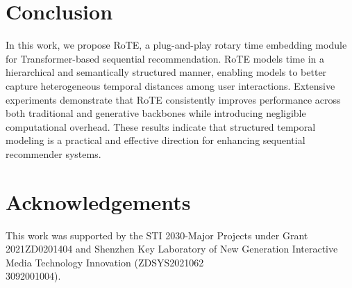 \documentclass[sigconf,natbib=true]{acmart}
\begin{document}
\section{Conclusion}

In this work, we propose RoTE, a plug-and-play rotary time embedding module for Transformer-based sequential recommendation. RoTE models time in a hierarchical and semantically structured manner, enabling models to better capture heterogeneous temporal distances among user interactions. Extensive experiments demonstrate that RoTE consistently improves performance across both traditional and generative backbones while introducing negligible computational overhead. These results indicate that structured temporal modeling is a practical and effective direction for enhancing sequential recommender systems.

\section*{Acknowledgements}

This work was supported by the STI 2030-Major Projects under Grant 2021ZD0201404  and Shenzhen Key Laboratory of New Generation Interactive Media Technology Innovation (ZDSYS2021062\\3092001004).






\end{document}
